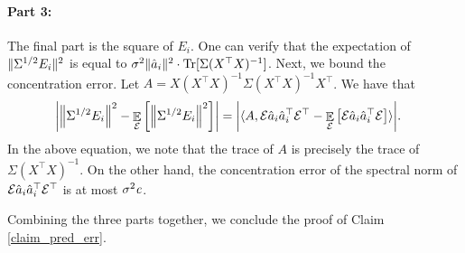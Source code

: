 	\paragraph{Part 3:} The final part is the square of $E_i$. One can verify that the expectation of $\|\Sigma^{1/2} E_i\|^2$ is equal to $\sigma^2 \|\hat{a}_i\|^2 \cdot \operatorname{Tr}[\Sigma (X^{\top} X)^{-1}]$.
	Next, we bound the concentration error.
	Let $A = X (X^{\top} X)^{-1} \Sigma (X^{\top} X)^{-1} X^{\top}$.
	We have that
	\begin{align*}
		{\left| {\left\| \Sigma^{1/2} E_i \right\|^2 - \mathop{\mathbb{E}}_{\mathcal{E}}\left[ \left\| \Sigma^{1/2} E_i \right\|^2 \right]} \right|}
		&= {\left| {\langle A, \mathcal{E} \hat{a}_i \hat{a}_i^{\top} \mathcal{E}^{\top} - \mathop{\mathbb{E}}_{\mathcal{E}}\left[ \mathcal{E} \hat{a}_i \hat{a}_i^{\top} \mathcal{E} \right] \rangle} \right|}.
	\end{align*}
	In the above equation, we note that the trace of $A$ is precisely the trace of $\Sigma (X^{\top} X)^{-1}$.
	On the other hand, the concentration error of the spectral norm of $\mathcal{E} \hat{a}_i \hat{a}_i^{\top} \mathcal{E}^{\top}$ is at most $\sigma^2 {\mathit{c}} $.

	Combining the three parts together, we conclude the proof of Claim \ref{claim_pred_err}.

